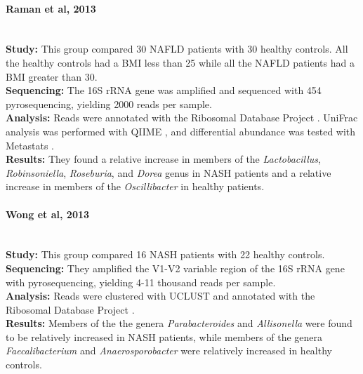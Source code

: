 \paragraph{Raman et al, 2013 \cite{raman2013fecal}}\mbox{}\\
\textbf{Study:} This group compared 30 NAFLD patients with 30 healthy controls. All the healthy controls had a BMI less than 25 while all the NAFLD patients had a BMI greater than 30.\\
\textbf{Sequencing:} The 16S rRNA gene was amplified and sequenced with 454 pyrosequencing, yielding 2000 reads per sample.\\
\textbf{Analysis:} Reads were annotated with the Ribosomal Database Project \cite{cole2009ribosomal}. UniFrac analysis was performed with QIIME \cite{caporaso2010qiime}, and differential abundance was tested with Metastats \cite{paulson2011metastats}.\\
\textbf{Results:} They found a relative increase in members of the \textit{Lactobacillus}, \textit{Robinsoniella}, \textit{Roseburia}, and \textit{Dorea} genus in NASH patients and a relative increase in members of the \textit{Oscillibacter} in healthy patients.

\paragraph{Wong et al, 2013 \cite{wong2013molecular}}\mbox{}\\
\textbf{Study:} This group compared 16 NASH patients with 22 healthy controls.\\
\textbf{Sequencing:} They amplified the V1-V2 variable region of the 16S rRNA gene with pyrosequencing, yielding 4-11 thousand reads per sample.\\
\textbf{Analysis:} Reads were clustered with UCLUST \cite{edgar2010search} and annotated with the Ribosomal Database Project \cite{cole2009ribosomal}.\\
\textbf{Results:} Members of the the genera \textit{Parabacteroides} and \textit{Allisonella} were found to be relatively increased in NASH patients, while members of the genera \textit{Faecalibacterium} and \textit{Anaerosporobacter} were relatively increased in healthy controls.

